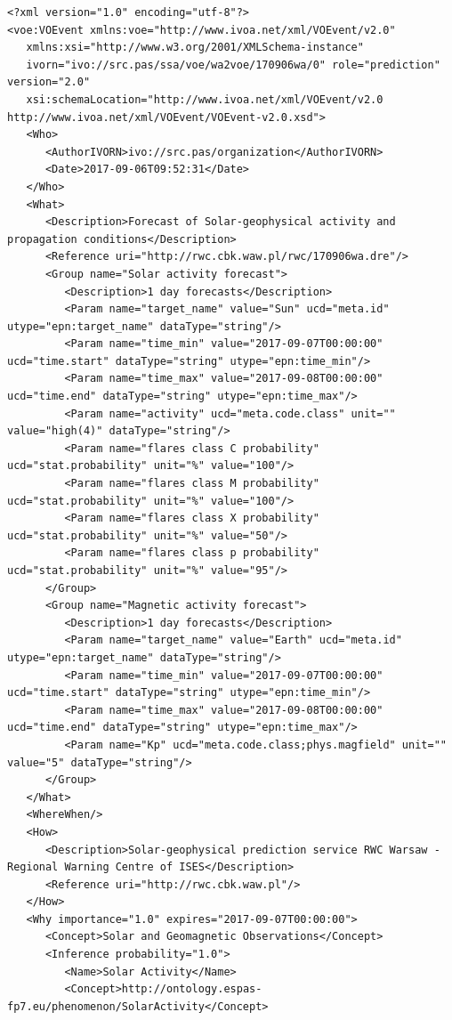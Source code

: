 \documentclass[referee,a4paper,12pt,traditabstract]{swsc}
\begin{document}
\begin{linenumbers}
{\tiny 
\begin{verbatim}
<?xml version="1.0" encoding="utf-8"?>
<voe:VOEvent xmlns:voe="http://www.ivoa.net/xml/VOEvent/v2.0"
   xmlns:xsi="http://www.w3.org/2001/XMLSchema-instance"
   ivorn="ivo://src.pas/ssa/voe/wa2voe/170906wa/0" role="prediction" version="2.0"
   xsi:schemaLocation="http://www.ivoa.net/xml/VOEvent/v2.0 http://www.ivoa.net/xml/VOEvent/VOEvent-v2.0.xsd">
   <Who>
      <AuthorIVORN>ivo://src.pas/organization</AuthorIVORN>
      <Date>2017-09-06T09:52:31</Date>
   </Who>
   <What>
      <Description>Forecast of Solar-geophysical activity and propagation conditions</Description>
      <Reference uri="http://rwc.cbk.waw.pl/rwc/170906wa.dre"/>
      <Group name="Solar activity forecast">
         <Description>1 day forecasts</Description>
         <Param name="target_name" value="Sun" ucd="meta.id" utype="epn:target_name" dataType="string"/>
         <Param name="time_min" value="2017-09-07T00:00:00" ucd="time.start" dataType="string" utype="epn:time_min"/>
         <Param name="time_max" value="2017-09-08T00:00:00" ucd="time.end" dataType="string" utype="epn:time_max"/>
         <Param name="activity" ucd="meta.code.class" unit="" value="high(4)" dataType="string"/>
         <Param name="flares class C probability" ucd="stat.probability" unit="%" value="100"/>
         <Param name="flares class M probability" ucd="stat.probability" unit="%" value="100"/>
         <Param name="flares class X probability" ucd="stat.probability" unit="%" value="50"/>
         <Param name="flares class p probability" ucd="stat.probability" unit="%" value="95"/>
      </Group>
      <Group name="Magnetic activity forecast">
         <Description>1 day forecasts</Description>
         <Param name="target_name" value="Earth" ucd="meta.id" utype="epn:target_name" dataType="string"/>
         <Param name="time_min" value="2017-09-07T00:00:00" ucd="time.start" dataType="string" utype="epn:time_min"/>
         <Param name="time_max" value="2017-09-08T00:00:00" ucd="time.end" dataType="string" utype="epn:time_max"/>
         <Param name="Kp" ucd="meta.code.class;phys.magfield" unit="" value="5" dataType="string"/>
      </Group>
   </What>
   <WhereWhen/>
   <How>
      <Description>Solar-geophysical prediction service RWC Warsaw - Regional Warning Centre of ISES</Description>
      <Reference uri="http://rwc.cbk.waw.pl"/>
   </How>
   <Why importance="1.0" expires="2017-09-07T00:00:00">
      <Concept>Solar and Geomagnetic Observations</Concept>
      <Inference probability="1.0">
         <Name>Solar Activity</Name>
         <Concept>http://ontology.espas-fp7.eu/phenomenon/SolarActivity</Concept>

\end{verbatim}}
\end{linenumbers}
\end{document}
